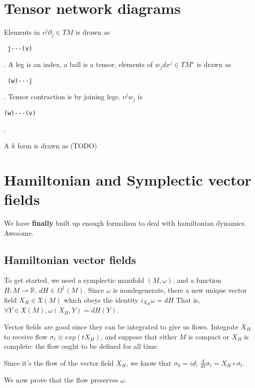 \documentclass[11pt]{book}
\newcommand{\Vectorfield}{\ensuremath{\mathfrak{X}}}
\begin{document}
\chapter{Tensor network diagrams}

Elements in $v^j \partial_j \in TM$  is drawn as 
\begin{verbatim} j---(v) \end{verbatim}. 
A leg is an index,
a ball is a tensor. 
elements of $w_j dx^j \in TM^\star$ is drawn as \begin{verbatim} (w)---j \end{verbatim}.
Tensor contraction is by joining legs. $v^j w_j$ is \begin{verbatim}(w)---(v)\end{verbatim}.

A $k$ form is drawn as (TODO)


\chapter{Hamiltonian and Symplectic vector fields}
We have \textbf{finally} built up enough formalism to deal with hamiltonian
dynamics. Awesome.

\section{Hamiltonian vector fields}

To get started, we need a symplectic manifold $(M, \omega)$, and a function
$H: M \rightarrow \mathbb R$. $dH \in \Omega^1(M)$. Since $\omega$ is
nondegenerate, there a new unique vector field $X_H \in \Vectorfield(M)$
which obeys the identity $i_{X_H} \omega = dH$ That is,
$\forall Y \in \Vectorfield(M), \omega(X_H, Y) = dH(Y)$.

Vector fields are good since they can be integrated to give us flows.
Integrate $X_H$ to receive flow $\sigma_t \equiv exp(tX_H)$, and suppose that either $M$ is
compact or $X_H$ is complete: the flow ought to be defined for all time.

Since it's the flow of the vector field $X_H$, we know that
$\sigma_0 = id;~\frac{d}{dt} \sigma_t = X_H \circ \sigma_t$.

We now prove that the flow preserves $\omega$.
\end{document}
